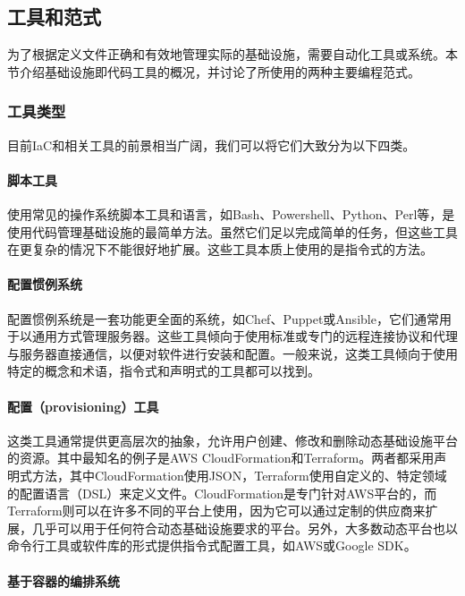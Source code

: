 \documentclass[macfonts,master]{njuthesis}
\begin{document}
\subsection{工具和范式}

为了根据定义文件正确和有效地管理实际的基础设施，需要自动化工具或系统。本节介绍基础设施即代码工具的概况，并讨论了所使用的两种主要编程范式。

\subsubsection{工具类型}
目前IaC和相关工具的前景相当广阔，我们可以将它们大致分为以下四类\cite{whatisiac}。

\paragraph{脚本工具}

使用常见的操作系统脚本工具和语言，如Bash、Powershell、Python、Perl等，是使用代码管理基础设施的最简单方法。虽然它们足以完成简单的任务，但这些工具在更复杂的情况下不能很好地扩展。这些工具本质上使用的是指令式的方法。

\paragraph{配置惯例系统}

配置惯例系统是一套功能更全面的系统，如Chef、Puppet或Ansible，它们通常用于以通用方式管理服务器。这些工具倾向于使用标准或专门的远程连接协议和代理与服务器直接通信，以便对软件进行安装和配置。一般来说，这类工具倾向于使用特定的概念和术语，指令式和声明式的工具都可以找到。

\paragraph{配置（provisioning）工具}

这类工具通常提供更高层次的抽象，允许用户创建、修改和删除动态基础设施平台的资源。其中最知名的例子是AWS CloudFormation和Terraform。两者都采用声明式方法，其中CloudFormation使用JSON，Terraform使用自定义的、特定领域的配置语言（DSL）来定义文件。CloudFormation是专门针对AWS平台的，而Terraform则可以在许多不同的平台上使用，因为它可以通过定制的供应商来扩展，几乎可以用于任何符合动态基础设施要求的平台。另外，大多数动态平台也以命令行工具或软件库的形式提供指令式配置工具，如AWS或Google SDK。

\paragraph{基于容器的编排系统}
\end{document}
